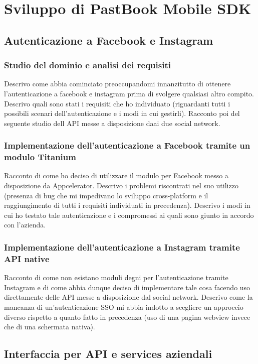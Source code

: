 	\section{Sviluppo di PastBook Mobile SDK}
		\subsection{Autenticazione a Facebook e Instagram}
			\subsubsection{Studio del dominio e analisi dei requisiti}
				Descrivo come abbia cominciato preoccupandomi innanzitutto di ottenere l'autenticazione a facebook e instagram prima
				di svolgere qualsiasi altro compito. Descrivo quali sono stati i requisiti che ho individuato (riguardanti tutti i
				possibili scenari dell'autenticazione e i modi in cui gestirli). Racconto poi del seguente studio dell API messe a
				disposizione daai due social network.
			\subsubsection{Implementazione dell'autenticazione a Facebook tramite un modulo Titanium}
				Racconto di come ho deciso di utilizzare il modulo per Facebook messo a disposizione da Appcelerator. Descrivo i
				problemi riscontrati nel suo utilizzo (presenza di bug che mi impedivano lo sviluppo cross-platform e il
				raggiungimento di tutti i requisiti individuati in precedenza). Descrivo i modi in cui ho testato tale autenticazione
				e i compromessi ai quali sono giunto in accordo con l'azienda.
			\subsubsection{Implementazione dell'autenticazione a Instagram tramite API native}
				Racconto di come non esistano moduli degni per l'autenticazione tramite Instagram e di come abbia dunque deciso di
				implementare tale cosa facendo uso direttamente delle API messe a disposizione dal social network. Descrivo come la
				mancanza di un'autenticazione SSO mi abbia indotto a scegliere un approccio diverso rispetto a quanto fatto in
				precedenza (uso di una pagina webview invece che di una schermata nativa).
		\subsection{Interfaccia per API e services aziendali}
